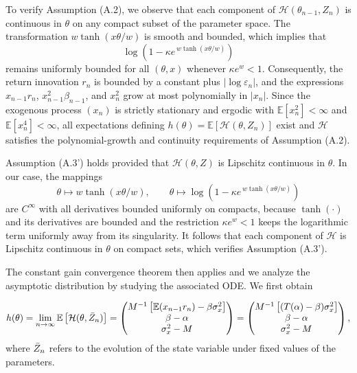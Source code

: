 \documentclass[11pt]{article}
\begin{document}
To verify Assumption (A.2), we observe that each component of $\mathcal{H}(\theta_{n-1},Z_n)$ is continuous in $\theta$ on any compact subset of the parameter space. The transformation $w\tanh(x\theta/w)$ is smooth and bounded, which implies that
\[
\log\!\left(1-\kappa e^{\,w\tanh(x\theta/w)}\right)
\]
remains uniformly bounded for all $(\theta,x)$ whenever $\kappa e^{w}<1$. Consequently, the return innovation $r_n$ is bounded by a constant plus $|\log\varepsilon_n|$, and the expressions $x_{n-1}r_n$, $x_{n-1}^2 \beta_{n-1}$, and $x_n^2$ grow at most polynomially in $|x_n|$. Since the exogenous process $(x_n)$ is strictly stationary and ergodic with $\mathbb{E}[x_n^2]<\infty$ and $\mathbb{E}[x_n^4]<\infty$, all expectations defining $h(\theta)=\mathbb{E}[\mathcal{H}(\theta,Z_n)]$ exist and $\mathcal{H}$ satisfies the polynomial-growth and continuity requirements of Assumption (A.2).

Assumption (A.3') holds provided that $\mathcal{H}(\theta,Z)$ is Lipschitz continuous in $\theta$. In our case, the mappings
\[
\theta \mapsto w\tanh(x\theta/w), \qquad 
\theta \mapsto \log\!\left(1-\kappa e^{\,w\tanh(x\theta/w)}\right)
\]
are $C^\infty$ with all derivatives bounded uniformly on compacts, because $\tanh(\cdot)$ and its derivatives are bounded and the restriction $\kappa e^{w}<1$ keeps the logarithmic term uniformly away from its singularity. It follows that each component of $\mathcal{H}$ is Lipschitz continuous in $\theta$ on compact sets, which verifies Assumption (A.3').

The constant gain convergence theorem then applies and we analyze the asymptotic distribution by studying the associated ODE.
We first obtain 

\begin{equation}
    h(\theta) = \lim_{n \to \infty} \mathbb{E} \left[\mathcal{H}(\theta, \Bar{Z}_n)\right] = 
    \begin{pmatrix}
        M^{-1} \left[ \mathbb{E}(x_{n-1} r_n) - \beta \sigma^2_x \right] \\
        \beta - \alpha \\
        \sigma^2_x - M
    \end{pmatrix} =
    \begin{pmatrix}
        M^{-1}\left[(T(\alpha) - \beta) \sigma^2_x\right] \\
        \beta - \alpha \\
        \sigma^2_x - M
    \end{pmatrix},
\end{equation}
where $\Bar{Z}_n$ refers to the evolution of the state variable under fixed values of the parameters.
\end{document}
